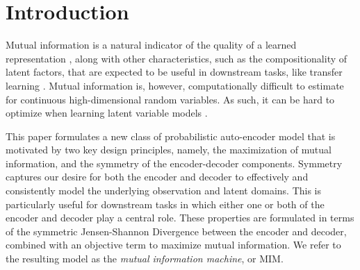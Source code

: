 
\section{Introduction} \label{sec:introduction}

Mutual information is a natural indicator of the quality of a learned representation
\citep{hjelm2018learning}, along with other characteristics, such as the compositionality of
latent factors, that are expected to be useful in downstream tasks, like transfer 
learning \citep{DBLP:journals/corr/BengioTPPB17}.
Mutual information is, however, computationally difficult to estimate for continuous
high-dimensional random variables.  As such, it can be hard to optimize when learning
latent variable models \citep{Hjelm2018,Chen2016}.


This paper formulates a new class of probabilistic auto-encoder model
that is motivated by two key design principles, namely, the maximization
of mutual information, and the symmetry of the encoder-decoder components.
Symmetry captures our desire for both the encoder and decoder to effectively
and consistently model the underlying observation and latent domains.
This is particularly useful for downstream tasks in which either one
or both of the encoder and decoder play a central role.
These properties are formulated in terms of the symmetric Jensen-Shannon
Divergence between the encoder and decoder, combined with an objective term
to maximize mutual information.  We refer to the resulting model as the
{\em mutual information machine}, or MIM.

